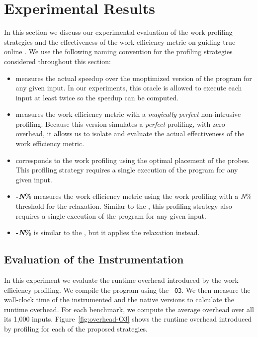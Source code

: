\section{Experimental Results}\label{sec:results}


In this section we discuss our experimental evaluation of the work profiling strategies and
the effectiveness of the work efficiency metric on guiding true online {\itercomp}.
We use the following naming convention for the profiling strategies considered
throughout this section:
\begin{itemize}[leftmargin=3mm]
\item \textbf{\OracleRM} measures the actual speedup over the unoptimized version of the program for any given input.
In our experiments, this oracle is allowed to execute each input at least twice so the speedup can be computed.
\item \textbf{\OraclePP} measures the work efficiency metric with a \textit{magically perfect} non-intrusive profiling.
  Because this version simulates a \textit{perfect} profiling, with zero overhead,
  it allows us to isolate and evaluate the actual effectiveness of the work efficiency metric.
\item \textbf{\OptProf} corresponds to the work profiling using the optimal placement of the probes.
  This profiling strategy requires a single execution of the program for any given input.
\item \textbf{\WCRelax-\textit{N}\%} measures the work efficiency metric using the work profiling with a \textit{N}\% threshold for
the \WCRelaxLower relaxation.
  Similar to the \OptProf, this profiling strategy also requires a single execution of the program for any given input.
\item \textbf{\WPRelax-\textit{N}\%} is similar to the \WCRelax, but it applies the \WPRelaxLower relaxation instead.
\end{itemize}

\subsection{Evaluation of the Instrumentation}

In this experiment we evaluate the runtime overhead introduced by the work efficiency profiling. We compile the program using the
\texttt{-O3}. We then measure the wall-clock time of the instrumented and the native versions to calculate the runtime overhead. For
each benchmark, we compute the average overhead over all its 1,000 inputs. 
Figure~\ref{fig:overhead-O3} shows the runtime overhead introduced by profiling for each of the proposed strategies.


